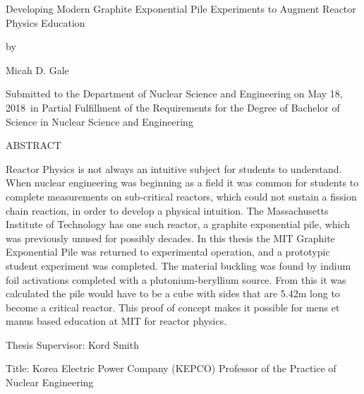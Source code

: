 \documentclass[twoside]{article}
\newcommand\blankpage{ %
    \null
    \thispagestyle{empty}
    \newpage}
\newcommand{\thesis}{Developing Modern Graphite Exponential Pile Experiments to Augment Reactor Physics Education}
\newcommand{\me}{Micah D. Gale}
\newcommand{\signDate}{May 18, 2018}
\newcommand{\advisorName}{Kord Smith}
\newcommand{\advisorTitle}{Korea Electric Power Company (KEPCO) Professor of the Practice of Nuclear Engineering}
\newcommand{\abstractart}{   
    Reactor Physics is not always an intuitive subject for students to understand. When nuclear engineering was beginning as a field it was common for students to complete measurements on sub-critical reactors, which could not sustain a fission chain reaction, in order to develop a physical intuition. The Massachusetts Institute of Technology has one such reactor, a graphite exponential pile, which was previously unused for possibly decades. In this thesis the MIT Graphite Exponential Pile was returned to experimental operation, and a prototypic student experiment was completed. The material buckling was found by indium foil activations completed with a plutonium-beryllium source. From this it was calculated the pile would have to be a cube with sides that are 5.42m long to become a critical reactor. This proof of concept makes it possible for mens et manus based education at MIT for reactor physics.
    }
\begin{document}
\newpage
\begin{titlepage}
\setcounter{page}{3} 
    \begin{center}
    {\large{\thesis}}
    
    \bigskip
    {by}
    
    \bigskip
    {\me}
    
    \bigskip
    {\parbox{3.7in}{\centering Submitted to the Department of Nuclear Science and Engineering on {\signDate}\ in Partial Fulfillment of the Requirements for the Degree of Bachelor of Science in Nuclear Science and Engineering}}
    \end{center}
    \bigskip
    
    \begin{flushleft}
    ABSTRACT
    
    \bigskip
    \abstractart
    \vfill
    {Thesis Supervisor: \advisorName}
    
    {Title: \advisorTitle}
    \end{flushleft}
    
\end{titlepage}
\blankpage
\end{document}
